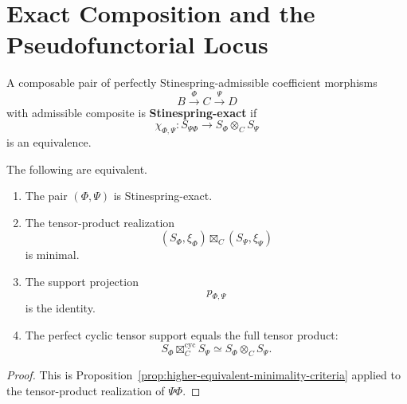 \section{Exact Composition and the Pseudofunctorial Locus}
\label{sec:higher-exact-composition}

\begin{definition}
\label{def:higher-stinespring-exact-pair}
A composable pair of perfectly Stinespring-admissible coefficient morphisms
\[
  B\xrightarrow{\Phi}C\xrightarrow{\Psi}D
\]
with admissible composite is \textbf{Stinespring-exact} if
\[
  \chi_{\Phi,\Psi}:
  S_{\Psi\Phi}
  \longrightarrow
  S_\Phi\otimes_CS_\Psi
\]
is an equivalence.
\end{definition}

\begin{proposition}
\label{prop:higher-exactness-criteria}
The following are equivalent.

\begin{enumerate}
  \item The pair \((\Phi,\Psi)\) is Stinespring-exact.

  \item The tensor-product realization
  \[
    (S_\Phi,\xi_\Phi)
    \boxtimes_C
    (S_\Psi,\xi_\Psi)
  \]
  is minimal.

  \item The support projection
  \[
    p_{\Phi,\Psi}
  \]
  is the identity.

  \item The perfect cyclic tensor support equals the full tensor product:
  \[
    S_\Phi
    \boxtimes_C^{\mathrm{cyc}}
    S_\Psi
    \simeq
    S_\Phi\otimes_CS_\Psi.
  \]
\end{enumerate}
\end{proposition}

\begin{proof}
This is
Proposition~\ref{prop:higher-equivalent-minimality-criteria} applied to the
tensor-product realization of \(\Psi\Phi\).
\end{proof}

